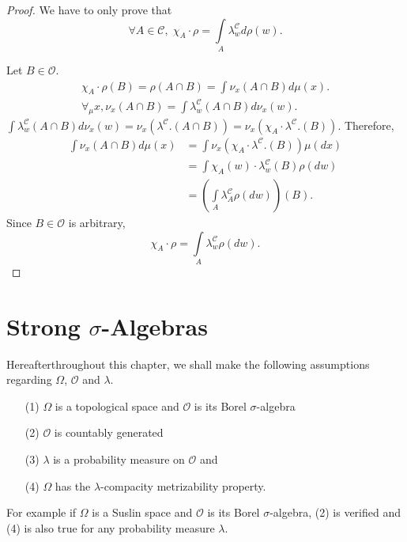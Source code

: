 \begin{proof}
We have to only prove that 
$$
\forall A \in \mathscr{C}, \; \chi_A \cdot \rho = \int\limits_A
\lambda^{\mathscr{C}}_w d \rho (w). 
$$

Let $B \in \mathscr{O}$.
\begin{gather*}
\chi_A \cdot \rho(B) = \rho(A \cap B) = \int \nu_x (A \cap B) d\mu
(x).\\
\forall_\mu x, \nu_x(A \cap B) = \int \lambda^\mathscr{C}_w (A\cap B)
d \nu_x(w). 
\end{gather*}
$\int \lambda^\mathscr{C}_w(A \cap B) d \nu_x(w) =\nu_x
(\lambda^\mathscr{C}. (A \cap B)) = \nu_x(\chi_A \cdot
\lambda^\mathscr{C}. (B))$. Therefore, 
\begin{align*}
\int \nu_x (A \cap B) d\mu (x) & = \int \nu_x (\chi_A \cdot
\lambda^\mathscr{C}. (B)) \mu (dx)\\
& = \int \chi_A (w) \cdot \lambda^\mathscr{C}_w (B) \rho (dw)\\
& = (\int\limits_A \lambda^\mathscr{C}_A \rho (dw)) (B). 
\end{align*}
Since $B \in \mathscr{O}$ is arbitrary,
$$
\chi_A \cdot \rho = \int\limits_A \lambda^\mathscr{C}_w \rho(dw). 
$$
\end{proof}

\section{Strong $\sigma$-Algebras}\label{part2:chap7:sec2}

Hereafter\pageoriginale throughout this chapter, we shall make the
following assumptions regarding $\Omega$, $\mathscr{O}$ and $\lambda$.
\begin{itemize}
\item[{\rm (1)}] $\Omega$ is a topological space and $\mathscr{O}$ is
  its Borel $\sigma$-algebra

\item[{\rm (2)}] $\mathscr{O}$ is countably generated

\item[{\rm (3)}] $\lambda$ is a probability measure on $\mathscr{O}$
  and 

\item[{\rm (4)}] $\Omega$ has the $\lambda$-compacity metrizability
  property. 
\end{itemize}

For example if  $\Omega$ is a Suslin space and $\mathscr{O}$ is its
Borel $\sigma$-algebra, (2) is verified and (4) is also true for any
probability measure $\lambda$. 

